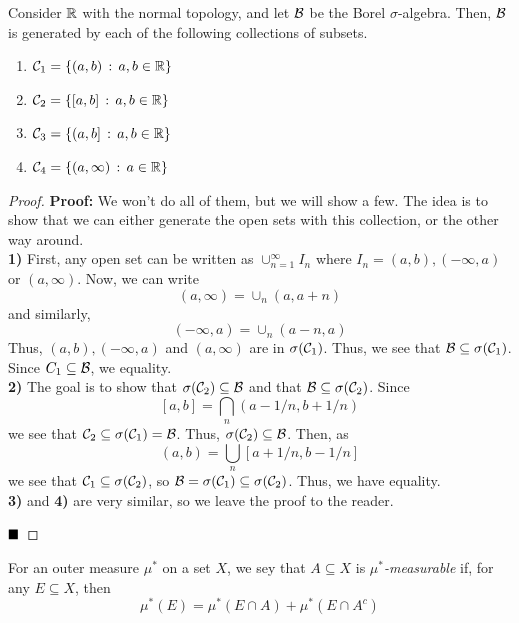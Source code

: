 \begin{lemma}
    Consider $\R$ with the normal topology, and let $\cal{B}$ be the Borel $\sigma$-algebra. Then, $\cal{B}$ is generated by each of the following collections of subsets.
    \begin{enumerate}
        \item $\cal{C}_1 = \{(a, b) \col a, b \in \R\}$
        \item $\cal{C}_2 = \{[a, b] \col a, b \in \R\}$
        \item $\cal{C}_3 = \{(a, b] \col a, b \in \R\}$
        \item $\cal{C}_4 = \{(a, \infty) \col a \in \R\}$
    \end{enumerate}
\end{lemma}
\begin{proof}{\textbf{Proof:}}
    We won't do all of them, but we will show a few. The idea is to show that we can either generate the open sets with this collection, or the other way around.\\

    \textbf{1)} First, any open set can be written as $\cup_{n = 1}^{\infty} I_n$ where $I_n = (a, b), (-\infty, a)$ or $(a, \infty)$. Now, we can write
    \[ (a, \infty) = \cup_{n} (a, a + n) \]
    and similarly, 
    \[ (-\infty, a) = \cup_{n} (a - n, a) \]
    Thus, $(a, b), (-\infty, a)$ and $(a, \infty)$ are in $\sigma(\cal{C}_1)$. Thus, we see that $\cal{B} \subseteq \sigma(\cal{C}_1)$. Since $C_1 \subseteq \cal{B}$, we equality.\\
    
    \textbf{2)} The goal is to show that $\sigma(\cal{C}_2) \subseteq \cal{B}$ and that $\cal{B} \subseteq \sigma(\cal{C}_2)$. Since
    \[ [a, b] = \bigcap_{n} (a - 1/n, b + 1/n) \]
    we see that $\cal{C}_2 \subseteq \sigma({\cal{C}_1}) = \cal{B}$. Thus, $\sigma({\cal{C}_2}) \subseteq \cal{B}$. Then, as
    \[ (a, b) = \bigcup_{n} [a + 1/n, b - 1/n] \]
    we see that $\cal{C}_1 \subseteq \sigma(\cal{C}_2)$, so $\cal{B} = \sigma(\cal{C}_1) \subseteq \sigma(\cal{C}_2)$. Thus, we have equality.\\

    \textbf{3)} and \textbf{4)} are very similar, so we leave the proof to the reader.

    $\qed$
\end{proof}

\begin{definition}
    For an outer measure $\mu^{*}$ on a set $X$, we sey that $A \subseteq X$ is \emph{$\mu^{*}$-measurable} if, for any $E \subseteq X$, then
    \[ \mu^{*}(E) = \mu^{*}(E \cap A) + \mu^{*}(E \cap A^{c}) \]
\end{definition}
